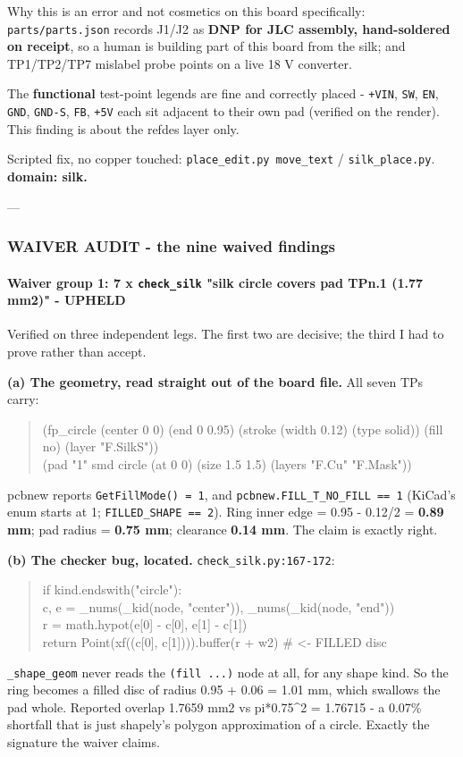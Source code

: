 \documentclass[11pt,a4paper]{article}
\begin{document}
Why this is an error and not cosmetics on this board specifically: \texttt{parts/parts.json} records J1/J2 as \textbf{DNP for JLC assembly, hand-soldered on receipt}, so a human is building part of this board from the silk; and TP1/TP2/TP7 mislabel probe points on a live 18 V converter.

The \textbf{functional} test-point legends are fine and correctly placed - \texttt{+VIN}, \texttt{SW}, \texttt{EN}, \texttt{GND}, \texttt{GND-S}, \texttt{FB}, \texttt{+5V} each sit adjacent to their own pad (verified on the render). This finding is about the refdes layer only.

Scripted fix, no copper touched: \texttt{place\_edit.py move\_text} / \texttt{silk\_place.py}. \textbf{domain: silk.}

---

\subsubsection*{WAIVER AUDIT - the nine waived findings}
\paragraph*{Waiver group 1: 7 x \texttt{check\_silk} "silk circle covers pad TPn.1 (1.77 mm2)" - \textbf{UPHELD}}
Verified on three independent legs. The first two are decisive; the third I had to prove rather than accept.

\textbf{(a) The geometry, read straight out of the board file.} All seven TPs carry:

\begin{quote}\small\ttfamily\raggedright
(fp\_circle (center 0 0) (end 0 0.95) (stroke (width 0.12) (type solid)) (fill no) (layer "F.SilkS"))\\
(pad "1" smd circle (at 0 0) (size 1.5 1.5) (layers "F.Cu" "F.Mask"))
\end{quote}
pcbnew reports \texttt{GetFillMode() = 1}, and \texttt{pcbnew.FILL\_T\_NO\_FILL == 1} (KiCad's enum starts at 1; \texttt{FILLED\_SHAPE == 2}). Ring inner edge = 0.95 - 0.12/2 = \textbf{0.89 mm}; pad radius = \textbf{0.75 mm}; clearance \textbf{0.14 mm}. The claim is exactly right.

\textbf{(b) The checker bug, located.} \texttt{check\_silk.py:167-172}:

\begin{quote}\small\ttfamily\raggedright
if kind.endswith("circle"):\\
    c, e = \_nums(\_kid(node, "center")), \_nums(\_kid(node, "end"))\\
    r = math.hypot(e{[}0{]} - c{[}0{]}, e{[}1{]} - c{[}1{]})\\
    return Point(xf((c{[}0{]}, c{[}1{]}))).buffer(r + w2)      \# \textless{}- FILLED disc
\end{quote}
\texttt{\_shape\_geom} never reads the \texttt{(fill ...)} node at all, for any shape kind. So the ring becomes a filled disc of radius 0.95 + 0.06 = 1.01 mm, which swallows the pad whole. Reported overlap 1.7659 mm2 vs pi{*}0.75\textasciicircum{}2 = 1.76715 - a 0.07\% shortfall that is just shapely's polygon approximation of a circle. Exactly the signature the waiver claims.
\end{document}

